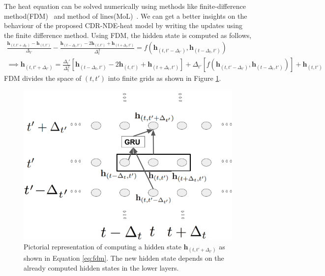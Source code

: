 \documentclass{article} %
\newcommand{\bh}{\mathbf{h}}
\begin{document}
The heat  equation can be solved numerically using methods like finite-difference method(FDM)~\citep{recktenwald2004finite} and method of lines(MoL)~\citep{schiesser2012numerical}. We can get a better insights  on the behaviour of the proposed CDR-NDE-heat model by writing the updates using the finite difference method.  Using FDM, the hidden state is computed as follows,
\begin{multline}
    \frac{\bh_{(t,t'+\Delta_{t'})} - \bh_{(t,t')}} {\Delta_{t'}} - \frac{\bh_{(t-\Delta_{t},t')} -2\bh_{(t,t')} + \bh_{(t +\Delta_{t},t')}} {\Delta_{t}^2} =  f(\bh_{(t,t'-\Delta_{t'})},\bh_{(t-\Delta_{t},t')}) \\
 \implies  \bh_{(t,t'+\Delta_{t'})} = \frac{\Delta_t'}{\Delta_{t}^2}[\bh_{(t-\Delta_{t},t')} -2\bh_{(t,t')} + \bh_{(t +\Delta_{t},t')}] + \Delta_{t'}[f(\bh_{(t,t'-\Delta_{t'})},\bh_{(t-\Delta_{t},t')}) ] + \bh_{(t,t')}
   \label{eq:fdm}
\end{multline}
 FDM divides the space of $(t,t')$ into finite grids as shown in Figure \ref{fig:gru-heat}.
 \begin{figure}
  \begin{center}
    \includegraphics[scale=0.3]{figures/drawings19.png}
  \end{center}
  \caption{Pictorial representation of computing a hidden state $\bh_{(t,t'+\Delta_{t'})}$ as shown in Equation \ref{eq:fdm}. The new hidden state depends on the already computed hidden states in the lower layers.}
  \label{fig:gru-heat}
\end{figure}
\end{document}
